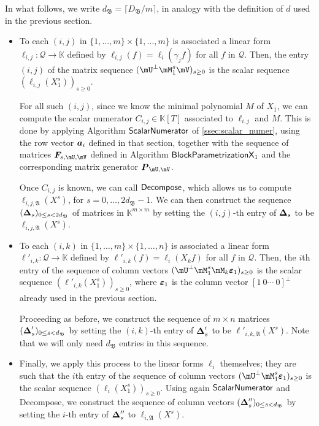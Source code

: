 \documentclass[12pt]{article}
\newcommand{\mat}[1]{\bm{\MakeUppercase{#1}}} %
\newcommand{\row}[1]{\bm{\MakeLowercase{#1}}} %
\newcommand{\col}[1]{\bm{\MakeLowercase{#1}}} %
\newcommand{\seqelt}[1]{\bm{F}_{#1}} %
\newcommand{\mainalgoname}{\mathsf{ BlockParametrization}}
\newcommand{\lf}{X}
\newcommand{\residueI}{\mathscr{Q}}
\def\K{\mathbb{K}}
\def\K {\ensuremath{\mathbb{K}}}
\begin{document}
In what follows, we write $d_\mathfrak{B}=\lceil D_\mathfrak{B}/m \rceil$,
in analogy with the definition of $d$ used in the previous section.
\begin{itemize}
\item To each $(i,j)$ in $\{1,\dots,m\}\times \{1,\dots,m\}$ is
  associated a linear form $\ell_{i,j}: \residueI\to \K$ defined by
  $\ell_{i,j}(f) =\ell_i(\gamma_j f)$ for all $f$ in $\residueI$.
  Then, the entry $(i,j)$ of the matrix sequence $(\mU^\perp \mM_1^s
  \mV)_{s \ge0}$ is the scalar sequence $(\ell_{i,j}(X_1^s))_{s \ge
    0}$.

\smallskip

  For all such $(i,j)$, since we know the minimal polynomial $M$ of
  $X_1$, we can compute the scalar numerator $C_{i,j} \in \K[T]$
  associated to $\ell_{i,j}$ and $M$. This is done by applying
  Algorithm $\mathsf{{\sf ScalarNumerator}}$ of
  \cref{ssec:scalar_numer}, using the row vector $\row{a}_i$ defined
  in that section, together with the sequence of matrices
  $\seqelt{s,\mU,\mV}$ defined in Algorithm $\mainalgoname{\sf X}_1$
  and the corresponding matrix generator $\mat{P}_{\mU,\mV}$.

\smallskip

Once $C_{i,j}$ is known, we can call ${\sf Decompose}$, which allows us
to compute $\ell_{i,j,\mathfrak{A}}(\lf^s)$, for
$s=0,\dots,2d_\mathfrak{B}-1$.  We can then construct the sequence
$(\mat{\Delta}_s)_{0 \le s < 2d_\mathfrak{B}}$ of matrices in
$\K^{m\times m}$ by setting the $(i,j)$-th entry of $\mat{\Delta}_s$
to be $\ell_{i,j,\mathfrak{A}}(\lf^s)$.

\smallskip

\item To each $(i,k)$ in $\{1,\dots,m\}\times \{1,\dots,n\}$ is
  associated a linear form $\ell'_{i,k}: \residueI\to \K$ defined by
  $\ell'_{i,k}(f) =\ell_i(X_k f)$ for all $f$ in $\residueI$.  Then,
  the $i$th entry of the sequence of column vectors $(\mU^\perp
  \mM_1^s \mM_k \col{\varepsilon}_1)_{s \ge0}$ is the scalar sequence
  $(\ell'_{i,k}(X_1^s))_{s \ge 0}$, where $\col{\varepsilon}_1$ is the
  column vector $[1~0\cdots~0]^\perp$ already used in the previous
  section.

\smallskip

  Proceeding as before, we construct the sequence of $m \times n$ matrices
  $(\mat{\Delta}'_s)_{0 \le s < d_\mathfrak{B}}$ by setting the
  $(i,k)$-th entry of $\mat{\Delta}'_s$ to be
  $\ell'_{i,k,\mathfrak{A}}(\lf^s)$. Note that we will only need $d_\mathfrak{B}$
  entries in this sequence.

\smallskip

\item Finally, we apply this process to the linear forms $\ell_i$
  themselves; they are such that the $i$th entry of the sequence of
  column vectors $(\mU^\perp \mM_1^s \col{\varepsilon}_1)_{s \ge0}$ is
  the scalar sequence $(\ell_{i}(X_1^s))_{s \ge 0}$. Using again
  $\mathsf{{\sf ScalarNumerator}}$ and {\sf Decompose}, we construct
  the sequence of column vectors $(\mat{\Delta}''_s)_{0 \le s <
    d_\mathfrak{B}}$ by setting the $i$-th entry of $\mat{\Delta}''_s$
  to $\ell_{i,\mathfrak{A}}(\lf^s)$.
\end{itemize}
\end{document}
